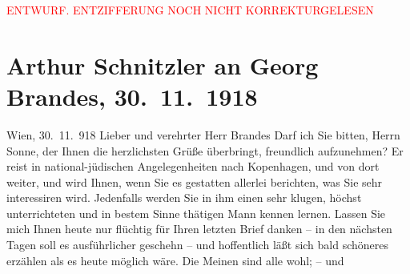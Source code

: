 
\begin{center}
            \textcolor{red}{ENTWURF. ENTZIFFERUNG NOCH NICHT KORREKTURGELESEN}
                      \end{center}
            
               \section[Arthur Schnitzler an Georg Brandes, 30. 11. 1918]{ Arthur Schnitzler an Georg Brandes, 30. 11. 1918}\nopagebreak{}\rehead{ }\begin{ledgroupsized}[t]{13cm}\normalsize\beginnumbering{} \toendnotes[C]{\smallbreak\pagebreak[2]} 
\toendnotes[C]{\smallbreak}\pstart
           \raggedleft{}{\pb}Wien, 30. 11. 918\pend
           \pstart{}Lieber und verehrter Herr Brandes\pend\pstart
           Darf ich Sie bitten, Herrn Sonne, der Ihnen
                    die herzlichsten Grüße überbringt, freundlich aufzunehmen? Er reist in
                    national-jüdischen Angelegenheiten nach Kopenhagen, und von dort weiter, und wird Ihnen, wenn Sie es gestatten
                    allerlei berichten, was Sie sehr interessiren wird. Jedenfalls werden Sie in ihm
                    einen sehr klugen, höchst unterrichteten und in bestem Sinne thätigen Mann
                    kennen lernen.\pend
           \pstart
           Lassen Sie mich Ihnen heute nur flüchtig für Ihren letzten Brief danken – in den
                    nächsten Tagen soll es ausführlicher geschehn – und hoffentlich läßt sich bald
                    schöneres erzählen als es heute möglich wäre. Die Meinen sind alle wohl; – und

\end{ledgroupsized}
